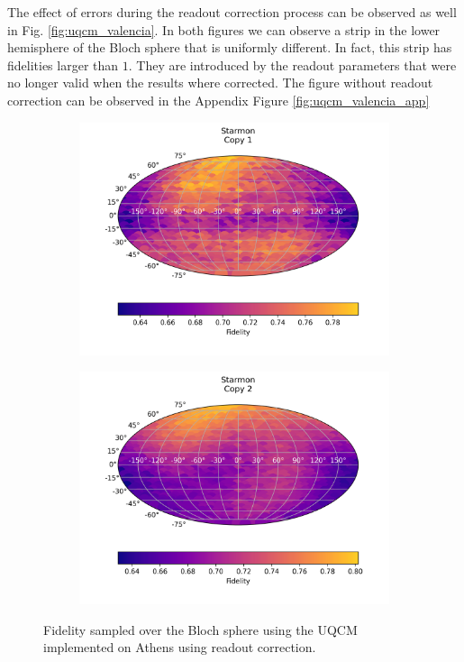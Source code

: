 The effect of errors during the readout correction process can be observed as well in Fig. \ref{fig:uqcm_valencia}. In both figures we can observe a strip in the lower hemisphere of the Bloch sphere that is uniformly different. In fact, this strip has fidelities larger than $1$. They are introduced by the readout parameters that were no longer valid when the results where corrected. The figure without readout correction can be observed in the Appendix Figure \ref{fig:uqcm_valencia_app}

\begin{figure}[H]
    \centering
    \begin{subfigure}{.5\textwidth}
      \centering
      \includegraphics[width=\textwidth]{Figures/UQCM/Starmon/FullSphere/results_corrected_starmon_copy1.png}
    \end{subfigure}%
    \begin{subfigure}{.5\textwidth}
      \centering
      \includegraphics[width=\textwidth]{Figures/UQCM/Starmon/FullSphere/results_corrected_starmon_copy2.png}
    \end{subfigure}
    \caption{Fidelity sampled over the Bloch sphere using the UQCM implemented on Athens using readout correction.}
    \label{fig:uqcm_starmon}
\end{figure}

